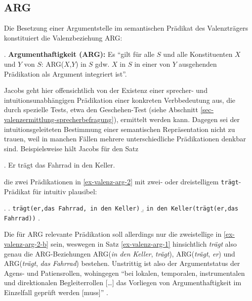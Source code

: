 



\subsection{ARG} \label{sec-arg}

Die Besetzung einer Argumentstelle im semantischen Prädikat des Valenzträgers konstituiert die Valenzbeziehung ARG:

\ex. {\bf Argumenthaftigkeit (ARG):} Es "`gilt für alle $S$ und alle Konstituenten $X$ und $Y$ von $S$: ARG($X$,$Y$) in $S$ gdw. $X$ in $S$ in einer von $Y$ ausgehenden Prädikation als Argument integriert ist"'. \citep[17]{Jacobs:94}

Jacobs geht hier offensichtlich von der Existenz einer sprecher- und intuitionsunabhängigen Prädikation einer konkreten Verbbedeutung aus, die durch spezielle Tests, etwa den Gesche\-hen-Test (siehe Abschnitt \ref{sec-valenzermittlung-sprecherbefragung}), ermittelt werden kann. Dagegen sei der intuitionsgeleiteten Bestimmung einer semantischen Repräsentation nicht zu trauen, weil in manchen Fällen mehrere unterschiedliche Prädikationen denkbar sind. Beispielsweise hält Jacobs für den Satz

\ex. Er trägt das Fahrrad in den Keller. \label{ex-valenz-arg-1}

die zwei Prädikationen in \ref{ex-valenz-arg-2} mit zwei- oder dreistelligem {\tt trägt}-Prädikat für intuitiv plausibel:

\ex. \label{ex-valenz-arg-2}
\a. {\tt trägt(er,das Fahrrad, in den Keller)}
\b. {\tt in den Keller(trägt(er,das Fahrrad))} \label{ex-valenz-arg-2-b}
\z. \citep[(6),(7)]{Jacobs:94}

Die für ARG relevante Prädikation soll allerdings nur die zweistellige in \ref{ex-valenz-arg-2-b} sein, weswegen in Satz \ref{ex-valenz-arg-1} hinsichtlich {\it trägt} also genau die ARG-Beziehungen ARG({\it in den Keller}, {\it trägt}), ARG({\it trägt}, {\it er}) und ARG({\it trägt}, {\it das Fahrrad}) bestehen. Unstrittig ist also der Argumentstatus der Agens- und Patiensrollen, wohingegen "`bei lokalen, temporalen, instrumentalen und direktionalen Begleiterrollen [\ldots] das Vorliegen von Argumenthaftigkeit im Einzelfall geprüft werden [muss]"' \citep[768]{Storrer:03}.

